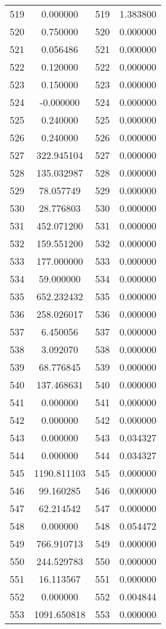 \documentclass[12pt]{article}
\begin{document}
\begin{longtable}{@{}cccc@{}}
519 & 0.000000 & 519 & 1.383800 \\
520 & 0.750000 & 520 & 0.000000 \\
521 & 0.056486 & 521 & 0.000000 \\
522 & 0.120000 & 522 & 0.000000 \\
523 & 0.150000 & 523 & 0.000000 \\
524 & -0.000000 & 524 & 0.000000 \\
525 & 0.240000 & 525 & 0.000000 \\
526 & 0.240000 & 526 & 0.000000 \\
527 & 322.945104 & 527 & 0.000000 \\
528 & 135.032987 & 528 & 0.000000 \\
529 & 78.057749 & 529 & 0.000000 \\
530 & 28.776803 & 530 & 0.000000 \\
531 & 452.071200 & 531 & 0.000000 \\
532 & 159.551200 & 532 & 0.000000 \\
533 & 177.000000 & 533 & 0.000000 \\
534 & 59.000000 & 534 & 0.000000 \\
535 & 652.232432 & 535 & 0.000000 \\
536 & 258.026017 & 536 & 0.000000 \\
537 & 6.450056 & 537 & 0.000000 \\
538 & 3.092070 & 538 & 0.000000 \\
539 & 68.776845 & 539 & 0.000000 \\
540 & 137.468631 & 540 & 0.000000 \\
541 & 0.000000 & 541 & 0.000000 \\
542 & 0.000000 & 542 & 0.000000 \\
543 & 0.000000 & 543 & 0.034327 \\
544 & 0.000000 & 544 & 0.034327 \\
545 & 1190.811103 & 545 & 0.000000 \\
546 & 99.160285 & 546 & 0.000000 \\
547 & 62.214542 & 547 & 0.000000 \\
548 & 0.000000 & 548 & 0.054472 \\
549 & 766.910713 & 549 & 0.000000 \\
550 & 244.529783 & 550 & 0.000000 \\
551 & 16.113567 & 551 & 0.000000 \\
552 & 0.000000 & 552 & 0.004844 \\
553 & 1091.650818 & 553 & 0.000000 \\

\end{longtable}
\end{document}
